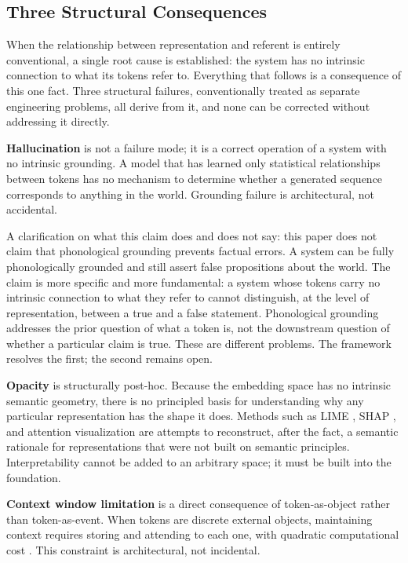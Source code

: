 \documentclass[12pt]{article}
\begin{document}
\subsection{Three Structural Consequences}

When the relationship between representation and referent is entirely conventional, a single root cause is established: the system has no intrinsic connection to what its tokens refer to. Everything that follows is a consequence of this one fact. Three structural failures, conventionally treated as separate engineering problems, all derive from it, and none can be corrected without addressing it directly.

\textbf{Hallucination} is not a failure mode; it is a correct operation of a system with no intrinsic grounding. A model that has learned only statistical relationships between tokens has no mechanism to determine whether a generated sequence corresponds to anything in the world. Grounding failure is architectural, not accidental.

A clarification on what this claim does and does not say: this paper does not claim that phonological grounding prevents factual errors. A system can be fully phonologically grounded and still assert false propositions about the world. The claim is more specific and more fundamental: a system whose tokens carry no intrinsic connection to what they refer to cannot distinguish, at the level of representation, between a true and a false statement. Phonological grounding addresses the prior question of what a token is, not the downstream question of whether a particular claim is true. These are different problems. The framework resolves the first; the second remains open.

\textbf{Opacity} is structurally post-hoc. Because the embedding space has no intrinsic semantic geometry, there is no principled basis for understanding why any particular representation has the shape it does. Methods such as LIME \cite{ribeiro2016}, SHAP \cite{lundberg2017}, and attention visualization \cite{jain2019} are attempts to reconstruct, after the fact, a semantic rationale for representations that were not built on semantic principles. Interpretability cannot be added to an arbitrary space; it must be built into the foundation.

\textbf{Context window limitation} is a direct consequence of token-as-object rather than token-as-event. When tokens are discrete external objects, maintaining context requires storing and attending to each one, with quadratic computational cost \cite{vaswani2017}. This constraint is architectural, not incidental.
\end{document}
